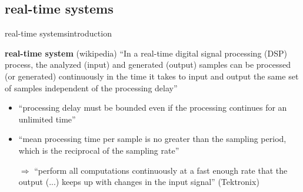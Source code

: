         \subsection{real-time systems}
	\begin{frame}{real-time systems}{introduction}
		\begin{block}{\textbf{real-time system} (wikipedia)}
            ``In a real-time digital signal processing (DSP) process, the analyzed (input) and generated (output) samples can be processed (or generated) continuously in the time it takes to input and output the same set of samples independent of the processing delay''
			
		\end{block}
        \pause
        \begin{itemize}
            \item   ``processing delay must be bounded even if the processing continues for an unlimited time''
            \pause  
            \item   ``mean processing time per sample is no greater than the sampling period, which is the reciprocal of the sampling rate''
            \pause
            \item[$\Rightarrow$] ``perform all computations continuously at a fast enough rate that the output (...) keeps up with changes in the input signal'' (Tektronix)
        \end{itemize}
        
	\end{frame}

